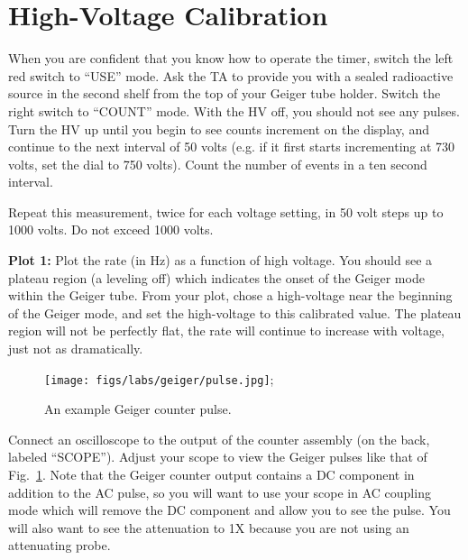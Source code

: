 \section{High-Voltage Calibration}

When you are confident that you know how to operate the timer, switch
the left red switch to ``USE'' mode.  Ask the TA to provide you with a
sealed radioactive source in the second shelf from the top of your
Geiger tube holder.  Switch the right switch to ``COUNT'' mode.  With
the HV off, you should not see any pulses.  Turn the HV up until you
begin to see counts increment on the display, and continue to the next
interval of 50 volts (e.g. if it first starts incrementing at 730
volts, set the dial to 750 volts).  Count the number of events in a
ten second interval.

Repeat this measurement, twice for each voltage setting, in 50 volt
steps up to 1000 volts.  Do not exceed 1000 volts.

{\bf Plot 1: } Plot the rate (in Hz) as a function of high voltage.
You should see a plateau region (a leveling off) which indicates the
onset of the Geiger mode within the Geiger tube.  From your plot,
chose a high-voltage near the beginning of the Geiger mode, and set
the high-voltage to this calibrated value.  The plateau region will
not be perfectly flat, the rate will continue to increase with
voltage, just not as dramatically.

\begin{figure}[htbp]
\begin{center}
 \texttt{[image: figs/labs/geiger/pulse.jpg]};
\caption{\label{fig:geigerpulse} An example Geiger counter pulse.}
\end{center}
\end{figure}

Connect an oscilloscope to the output of the counter assembly (on the
back, labeled ``SCOPE'').  Adjust your scope to view the Geiger pulses
like that of Fig.~\ref{fig:geigerpulse}.  Note that the Geiger counter
output contains a DC component in addition to the AC pulse, so you
will want to use your scope in AC coupling mode which will remove the
DC component and allow you to see the pulse.  You will also want to
see the attenuation to 1X because you are not using an attenuating
probe.  

